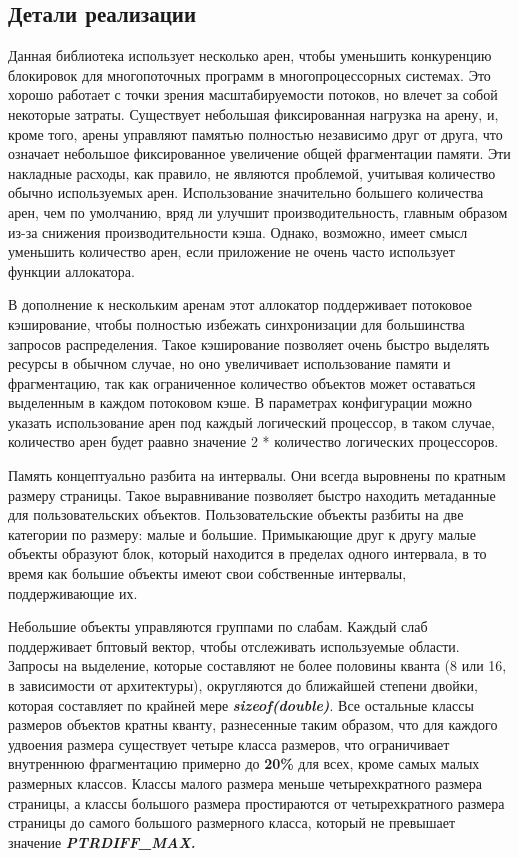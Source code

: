 \subsection{Детали реализации}
Данная библиотека использует несколько арен, чтобы уменьшить конкуренцию блокировок для многопоточных программ в многопроцессорных системах. Это хорошо работает с точки зрения масштабируемости потоков, но влечет за собой некоторые затраты. Существует небольшая фиксированная нагрузка на арену, и, кроме того, арены управляют памятью полностью независимо друг от друга, что означает небольшое фиксированное увеличение общей фрагментации памяти. Эти накладные расходы, как правило, не являются проблемой, учитывая количество обычно используемых арен. Использование значительно большего количества арен, чем по умолчанию, вряд ли улучшит производительность, главным образом из-за снижения производительности кэша. Однако, возможно, имеет смысл уменьшить количество арен, если приложение не очень часто использует функции аллокатора.\cite{jemalloc-fb-blog}

В дополнение к нескольким аренам этот аллокатор поддерживает потоковое кэширование, чтобы полностью избежать синхронизации для большинства запросов распределения. Такое кэширование позволяет очень быстро выделять ресурсы в обычном случае, но оно увеличивает использование памяти и фрагментацию, так как ограниченное количество объектов может оставаться выделенным в каждом потоковом кэше. В параметрах конфигурации можно указать использование арен под каждый логический процессор, в таком случае, количество арен будет раавно значение 2 * количество логических процессоров.

Память концептуально разбита на интервалы. Они всегда выровнены по кратным размеру страницы. Такое выравнивание позволяет быстро находить метаданные для пользовательских объектов. Пользовательские объекты разбиты на две категории по размеру: малые и большие. Примыкающие друг к другу малые объекты образуют блок, который находится в пределах одного интервала, в то время как большие объекты имеют свои собственные интервалы, поддерживающие их.

Небольшие объекты управляются группами по слабам. Каждый слаб поддерживает бптовый вектор, чтобы отслеживать используемые области. Запросы на выделение, которые составляют не более половины кванта (8 или 16, в зависимости от архитектуры), округляются до ближайшей степени двойки, которая составляет по крайней мере \textit{\textbf{sizeof(double)}}. Все остальные классы размеров объектов кратны кванту, разнесенные таким образом, что для каждого удвоения размера существует четыре класса размеров, что ограничивает внутреннюю фрагментацию примерно до \textbf{20\%} для всех, кроме самых малых размерных классов. Классы малого размера меньше четырехкратного размера страницы, а классы большого размера простираются от четырехкратного размера страницы до самого большого размерного класса, который не превышает значение \textit{\textbf{PTRDIFF\_MAX.}}

